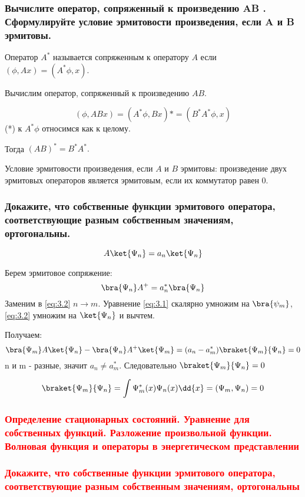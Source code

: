 \subsubsection{Вычислите оператор, сопряженный к произведению AB . Сформулируйте условие эрмитовости произведения, если A и B эрмитовы.}



Оператор $A^*$ называется сопряженным к оператору $A$ если $(\phi, Ax)=(A^*\phi,x).$

Вычислим оператор, сопряженный к произведению $AB$.

$$(\phi, ABx)= (A^*\phi,Bx)*=(B^*A^*\phi,x) $$
(*) к $A^*\phi$  относимся как к целому.

Тогда $(AB)^*=B^*A^*.$

Условие эрмитовости произведения, если $A$ и  $B$ эрмитовы:
произведение двух эрмитовых операторов является эрмитовым, если их коммутатор равен 0.

\subsubsection{Докажите, что собственные функции эрмитового оператора, соответствующие разным собственным значениям, ортогональны.}


\begin{equation}
\label{eq:3.1}
A\ket{\Psi_n}=a_n\ket{\Psi_n} 	
\end{equation}

Берем эрмитовое сопряжение:
\begin{equation}
	\label{eq:3.2}
\bra{\Psi_n}A^+=a_n^*\bra{\Psi_n} 
\end{equation}
Заменим в \eqref{eq:3.2} $n\rightarrow m$. Уравнение \eqref{eq:3.1} скалярно умножим на $\bra{\psi_m}$, \eqref{eq:3.2} умножим на $\ket{\Psi_n}$  и вычтем.

Получаем:
\begin{equation}
	\bra{\Psi_m}A\ket{\Psi_n}-\bra{\Psi_n}A^+\ket{\Psi_m}=(a_n-a^*_m)
	\braket{\Psi_m}{\Psi_n}=0
\end{equation}
n и m - разные, значит $a_n\neq a_m^*$. Следовательно $\braket{\Psi_m}{\Psi_n}=0$

$$\big \braket{\Psi_m}{\Psi_n}=\int \Psi_m^*(x)\Psi_n(x)\dd{x}=(\Psi_m,\Psi_n)=0 $$

\subsubsection{\textcolor{red} {Определение стационарных состояний. Уравнение для собственных функций. Разложение произвольной функции. Волновая функция и операторы в энергетическом представлении}}

\subsubsection{\textcolor{red} {Докажите, что собственные функции эрмитового оператора, соответствующие разным собственным значениям, ортогональны} }